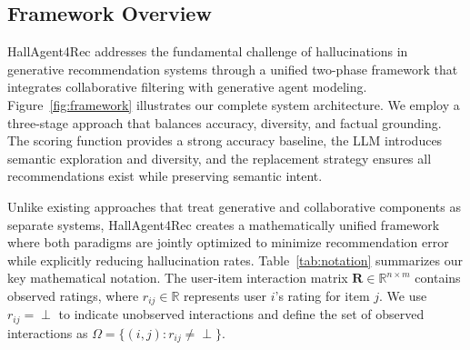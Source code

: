 \documentclass[acmsmall]{acmart}
\begin{document}
\subsection{Framework Overview}
\label{sec:framework_overview}

HallAgent4Rec addresses the fundamental challenge of hallucinations in generative recommendation systems through a unified two-phase framework that integrates collaborative filtering with generative agent modeling. Figure~\ref{fig:framework} illustrates our complete system architecture.
We employ a three-stage approach that balances accuracy, diversity, and factual grounding. The scoring function provides a strong accuracy baseline, the LLM introduces semantic exploration and diversity, and the replacement strategy ensures all recommendations exist while preserving semantic intent.

Unlike existing approaches that treat generative and collaborative components as separate systems, HallAgent4Rec creates a mathematically unified framework where both paradigms are jointly optimized to minimize recommendation error while explicitly reducing hallucination rates.
Table~\ref{tab:notation} summarizes our key mathematical notation. 
The user-item interaction matrix $\mathbf{R} \in \mathbb{R}^{n \times m}$ contains observed ratings, where $r_{ij} \in \mathbb{R}$ represents user $i$'s rating for item $j$. We use $r_{ij} = \perp$ to indicate unobserved interactions and define the set of observed interactions as $\Omega = \{(i,j) : r_{ij} \neq \perp\}$.
\end{document}
